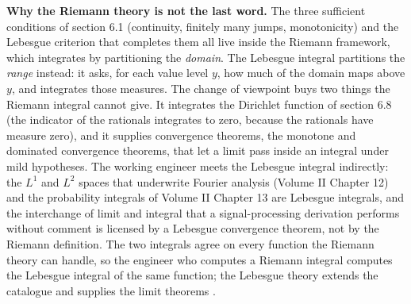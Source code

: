 \begin{mastery}
\textbf{Why the Riemann theory is not the last word.} The three
sufficient conditions of section 6.1 (continuity, finitely many
jumps, monotonicity) and the Lebesgue criterion that completes them
all live inside the Riemann framework, which integrates by partitioning
the \emph{domain}. The Lebesgue integral partitions the \emph{range}
instead: it asks, for each value level $y$, how much of the domain
maps above $y$, and integrates those measures. The change of viewpoint
buys two things the Riemann integral cannot give. It integrates the
Dirichlet function of section 6.8 (the indicator of the rationals
integrates to zero, because the rationals have measure zero), and it
supplies convergence theorems, the monotone and dominated convergence
theorems, that let a limit pass inside an integral under mild
hypotheses. The working engineer meets the Lebesgue integral
indirectly: the $L^{1}$ and $L^{2}$ spaces that underwrite Fourier
analysis (Volume II Chapter 12) and the probability integrals of
Volume II Chapter 13 are Lebesgue integrals, and the interchange of
limit and integral that a signal-processing derivation performs
without comment is licensed by a Lebesgue convergence theorem, not by
the Riemann definition. The two integrals agree on every function the
Riemann theory can handle, so the engineer who computes a Riemann
integral computes the Lebesgue integral of the same function; the
Lebesgue theory extends the catalogue and supplies the limit theorems
\cite{text:v2ch06-apostol-calculus}.
\end{mastery}

